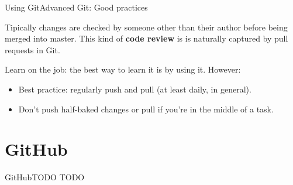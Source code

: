 \documentclass{beamer}
\begin{document}
\begin{frame}{Using Git}{Advanced Git: Good practices}


Tipically changes are checked by someone other than their
author before being merged into master. This kind of \textbf{code review} is is naturally captured by pull requests in Git.

Learn on the job: the best way to learn it is by using it. However:
\begin{itemize}
  \item Best practice: regularly push and pull (at least daily, in general).
  \item Don't push half-baked changes or pull if you're in the middle of a task.
\end{itemize}

\end{frame}

\section{GitHub}
\begin{frame}{GitHub}{TODO}
TODO
\end{frame}


% 
% 


\end{document}
